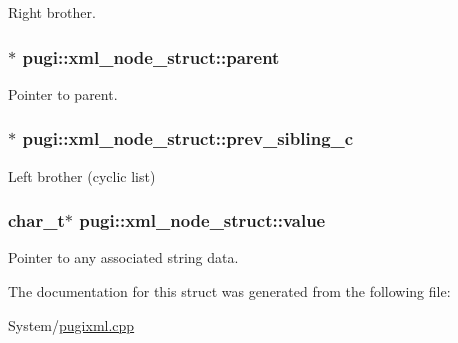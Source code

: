 Right brother. 

\hypertarget{structpugi_1_1xml__node__struct_af692c222bcc5a9f61108cb3ae0b7b5ea}{
\subsubsection[{parent}]{$\ast$ pugi\-::xml\-\_\-node\-\_\-struct\-::parent}}\label{structpugi_1_1xml__node__struct_af692c222bcc5a9f61108cb3ae0b7b5ea}


Pointer to parent. 

\hypertarget{structpugi_1_1xml__node__struct_a74e62128c88c422c0ed969633bbb2d4e}{
\subsubsection[{prev\-\_\-sibling\-\_\-c}]{$\ast$ pugi\-::xml\-\_\-node\-\_\-struct\-::prev\-\_\-sibling\-\_\-c}}\label{structpugi_1_1xml__node__struct_a74e62128c88c422c0ed969633bbb2d4e}


Left brother (cyclic list) 

\hypertarget{structpugi_1_1xml__node__struct_a191e708864fccda17bb66157afdadd2d}{
\subsubsection[{value}]{\setlength{\rightskip}{0pt plus 5cm}char\-\_\-t$\ast$ pugi\-::xml\-\_\-node\-\_\-struct\-::value}}\label{structpugi_1_1xml__node__struct_a191e708864fccda17bb66157afdadd2d}


Pointer to any associated string data. 



The documentation for this struct was generated from the following file\-:\begin{DoxyCompactItemize}
\item 
System/\hyperlink{pugixml_8cpp}{pugixml.\-cpp}\end{DoxyCompactItemize}
